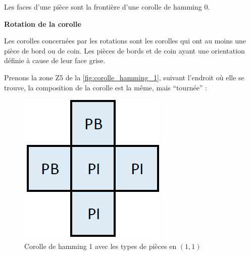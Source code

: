 	\begin{exmp}
		Les faces d'une pièce sont la frontière d'une corolle de hamming 0.
	\end{exmp}
	
	\textbf{Rotation de la corolle}
	
	Les corolles concernées par les rotations sont les corolles qui ont au moins une pièce de bord ou de coin. Les pièces de bords et de coin ayant une orientation définie à cause de leur face grise.
	
	\begin{exmp}
		Prenons la zone Z5 de la \autoref{fig:corolle_hamming_1}, suivant l'endroit où elle se trouve, la composition de la corolle est la même, mais \enquote{tournée} : \\
		\begin{minipage}{0.24\textwidth}
			\begin{figure}[H]
				\centering
				\includegraphics[width=\linewidth]{images/corolle_zone_orientee}
				\caption{Corolle de hamming 1 avec les types de pièces en $(1,1)$}
				\label{fig:corolle_zone_orientee}
			\end{figure}
		\end{minipage}\hfill
		\begin{minipage}{0.24\textwidth}
			\begin{figure}[H]

\end{figure}
\end{minipage}
\end{exmp}
